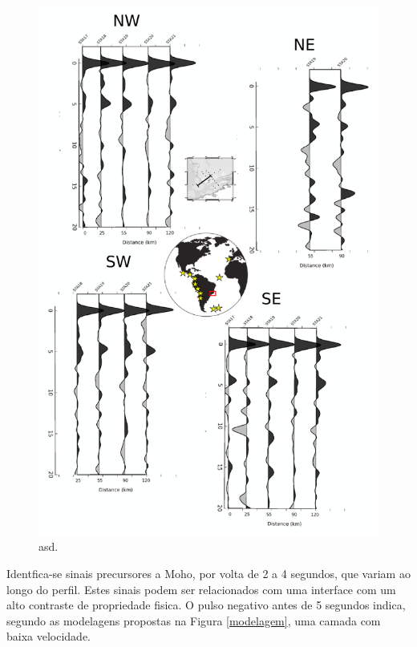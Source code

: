 \begin{figure}[!ht]
\centering
\includegraphics[scale=0.5]{Figs/RF_azimute_perfil3.png}
\caption{asd.}
\label{RF_perfil3}
\end{figure}


Identfica-se sinais precursores a Moho, por volta de 2 a 4 segundos, que variam ao longo do perfil. Estes sinais podem ser relacionados com uma interface com um alto contraste de propriedade fisica. O pulso negativo antes de 5 segundos indica, segundo as modelagens propostas na Figura \ref{modelagem}, uma camada com baixa velocidade.

\pagebreak